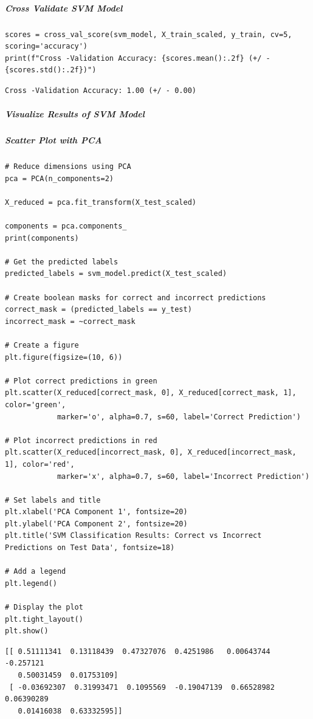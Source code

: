 \subparagraph{Cross Validate SVM Model}

\begin{verbatim}
scores = cross_val_score(svm_model, X_train_scaled, y_train, cv=5, scoring='accuracy')
print(f"Cross -Validation Accuracy: {scores.mean():.2f} (+/ - {scores.std():.2f})")
\end{verbatim}

\begin{verbatim}
Cross -Validation Accuracy: 1.00 (+/ - 0.00)
\end{verbatim}

\subparagraph{Visualize Results of SVM Model}

\subparagraph{Scatter Plot with PCA}

\begin{verbatim}
# Reduce dimensions using PCA
pca = PCA(n_components=2)

X_reduced = pca.fit_transform(X_test_scaled)

components = pca.components_
print(components)

# Get the predicted labels
predicted_labels = svm_model.predict(X_test_scaled)

# Create boolean masks for correct and incorrect predictions
correct_mask = (predicted_labels == y_test)
incorrect_mask = ~correct_mask

# Create a figure
plt.figure(figsize=(10, 6))

# Plot correct predictions in green
plt.scatter(X_reduced[correct_mask, 0], X_reduced[correct_mask, 1], color='green',
            marker='o', alpha=0.7, s=60, label='Correct Prediction')

# Plot incorrect predictions in red
plt.scatter(X_reduced[incorrect_mask, 0], X_reduced[incorrect_mask, 1], color='red',
            marker='x', alpha=0.7, s=60, label='Incorrect Prediction')

# Set labels and title
plt.xlabel('PCA Component 1', fontsize=20)
plt.ylabel('PCA Component 2', fontsize=20)
plt.title('SVM Classification Results: Correct vs Incorrect Predictions on Test Data', fontsize=18)

# Add a legend
plt.legend()

# Display the plot
plt.tight_layout()
plt.show()
\end{verbatim}

\begin{verbatim}
[[ 0.51111341  0.13118439  0.47327076  0.4251986   0.00643744 -0.257121
   0.50031459  0.01753109]
 [ -0.03692307  0.31993471  0.1095569  -0.19047139  0.66528982  0.06390289
   0.01416038  0.63332595]]
\end{verbatim}


